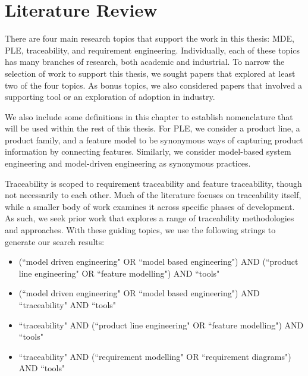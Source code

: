 \chapter{Literature Review}
\label{chap:lit_rev}

There are four main research topics that support the work in this thesis: \gls{MDE}, \gls{PLE}, traceability, and requirement engineering. Individually, each of these topics has many branches of research, both academic and industrial. To narrow the selection of work to support this thesis, we sought papers that explored at least two of the four topics. As bonus topics, we also considered papers that involved a supporting tool or an exploration of adoption in industry. 

We also include some definitions in this chapter to establish nomenclature that will be used within the rest of this thesis. For \gls{PLE}, we consider a product line, a product family, and a feature model to be synonymous ways of capturing product information by connecting features. Similarly, we consider model-based system engineering and model-driven engineering as synonymous practices.

Traceability is scoped to requirement traceability and feature traceability, though not necessarily to each other. Much of the literature focuses on traceability itself, while a smaller body of work examines it across specific phases of development. As such, we seek prior work that explores a range of traceability methodologies and approaches. With these guiding topics, we use the following strings to generate our search results:

\begin{itemize}
	\item (``model driven engineering" OR ``model based engineering") AND (``product line engineering" OR ``feature modelling") AND ``tools"
	\item (``model driven engineering" OR ``model based engineering") AND ``traceability" AND ``tools"
	\item ``traceability" AND (``product line engineering" OR ``feature modelling") AND ``tools"
	\item ``traceability" AND (``requirement modelling" OR ``requirement diagrams") AND ``tools"
\end{itemize}

